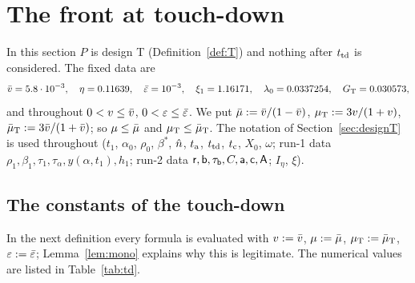 \section{The front at touch-down}\label{sec:touch}

In this section $P$ is design T (Definition~\ref{def:T}) and nothing after $t_{\mathrm{td}}$ is considered. The fixed data are
\[
\bar v=5.8\cdot10^{-3},\quad\eta=0.11639,\quad\bar\varepsilon=10^{-3},\quad\xi_1=1.16171,\quad\lambda_0=0.0337254,\quad G_{\mathrm T}=0.030573,
\]
and throughout $0<v\le\bar v$, $0<\varepsilon\le\bar\varepsilon$. We put $\bar\mu:=\bar v/(1-\bar v)$, $\mu_{\mathrm T}:=3v/(1+v)$, $\bar\mu_{\mathrm T}:=3\bar v/(1+\bar v)$; so
$\mu\le\bar\mu$ and $\mu_{\mathrm T}\le\bar\mu_{\mathrm T}$. The notation of Section~\ref{sec:designT} is used throughout ($t_1$, $\alpha_0$, $\rho_0$, $\beta^*$,
$\hat n$, $t_{\mathrm a}$, $t_{\mathrm{td}}$, $t_{\mathrm c}$, $X_0$, $\omega$; run-1 data $\rho_1,\beta_1,\tau_1,\tau_\alpha,y(\alpha,t_1),h_1$; run-2 data
$\mathsf r,\mathsf b,\tau_{\mathsf b},C,\mathsf a,\mathsf c,\mathsf A$; $I_\eta$, $\xi$).

\subsection{The constants of the touch-down}\label{sec:tdconst}

In the next definition every formula is evaluated with $v:=\bar v$, $\mu:=\bar\mu$, $\mu_{\mathrm T}:=\bar\mu_{\mathrm T}$, $\varepsilon:=\bar\varepsilon$; Lemma~\ref{lem:mono}
explains why this is legitimate. The numerical values are listed in Table~\ref{tab:td}.

